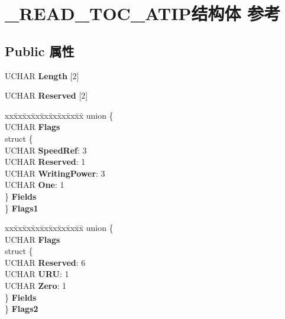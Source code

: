 \hypertarget{struct___r_e_a_d___t_o_c___a_t_i_p}{}\section{\+\_\+\+R\+E\+A\+D\+\_\+\+T\+O\+C\+\_\+\+A\+T\+I\+P结构体 参考}
\label{struct___r_e_a_d___t_o_c___a_t_i_p}
\subsection*{Public 属性}
\begin{DoxyCompactItemize}
\item 
\mbox{\label{struct___r_e_a_d___t_o_c___a_t_i_p_a5702c9484c19bbe3f396a7f9cb199410}} 
U\+C\+H\+AR {\bfseries Length} \mbox{[}2\mbox{]}
\item 
\mbox{\label{struct___r_e_a_d___t_o_c___a_t_i_p_a2b0db0d2f6b844a2107f81010c4c24f7}} 
U\+C\+H\+AR {\bfseries Reserved} \mbox{[}2\mbox{]}
\item 
\mbox{\label{struct___r_e_a_d___t_o_c___a_t_i_p_a783e09bca53ae666ef1df16be50d83e8}} 
\begin{tabbing}
xx\=xx\=xx\=xx\=xx\=xx\=xx\=xx\=xx\=\kill
union \{\\
\>UCHAR {\bfseries Flags}\\
\>struct \{\\
\>\>UCHAR {\bfseries SpeedRef}: 3\\
\>\>UCHAR {\bfseries Reserved}: 1\\
\>\>UCHAR {\bfseries WritingPower}: 3\\
\>\>UCHAR {\bfseries One}: 1\\
\>\} {\bfseries Fields}\\
\} {\bfseries Flags1}\\

\end{tabbing}\item 
\mbox{\label{struct___r_e_a_d___t_o_c___a_t_i_p_a623c698c5b304f3b0df14aa510e0c1b3}} 
\begin{tabbing}
xx\=xx\=xx\=xx\=xx\=xx\=xx\=xx\=xx\=\kill
union \{\\
\>UCHAR {\bfseries Flags}\\
\>struct \{\\
\>\>UCHAR {\bfseries Reserved}: 6\\
\>\>UCHAR {\bfseries URU}: 1\\
\>\>UCHAR {\bfseries Zero}: 1\\
\>\} {\bfseries Fields}\\
\} {\bfseries Flags2}\\


\end{tabbing}
\end{DoxyCompactItemize}
